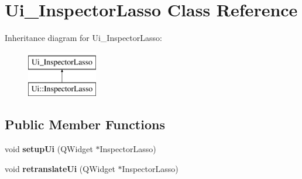 \hypertarget{class_ui___inspector_lasso}{}\section{Ui\+\_\+\+Inspector\+Lasso Class Reference}
\label{class_ui___inspector_lasso}
Inheritance diagram for Ui\+\_\+\+Inspector\+Lasso\+:\begin{figure}[H]
\begin{center}
\leavevmode
\includegraphics[height=2.000000cm]{class_ui___inspector_lasso}
\end{center}
\end{figure}
\subsection*{Public Member Functions}
\begin{DoxyCompactItemize}
\item 
\mbox{\label{class_ui___inspector_lasso_a7155193c5d060957c92e8870e6251b4d}} 
void {\bfseries setup\+Ui} (Q\+Widget $\ast$Inspector\+Lasso)
\item 
\mbox{\label{class_ui___inspector_lasso_a0d17b1e14670e1bcdaac0188c0f22f50}} 
void {\bfseries retranslate\+Ui} (Q\+Widget $\ast$Inspector\+Lasso)
\end{DoxyCompactItemize}
